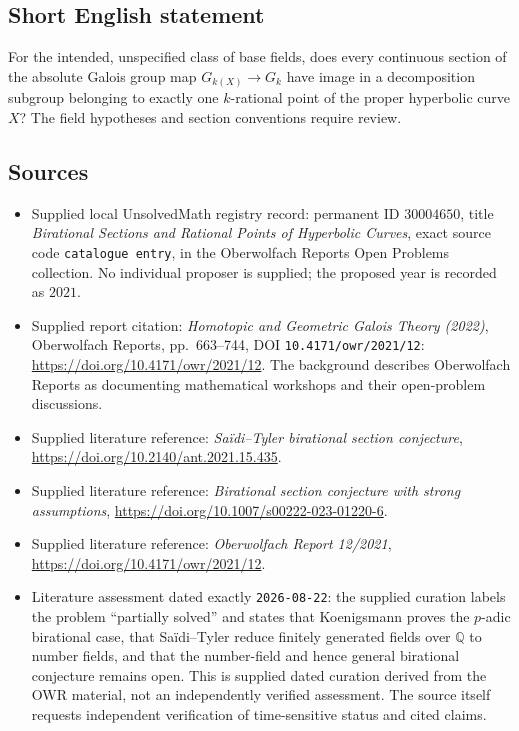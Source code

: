 \documentclass[11pt]{article}
\newcommand{\Q}{\mathbb{Q}}
\begin{document}
\subsection{Short English statement}
For the intended, unspecified class of base fields, does every continuous section of the absolute Galois group map \(G_{k(X)}\to G_k\) have image in a decomposition subgroup belonging to exactly one \(k\)-rational point of the proper hyperbolic curve \(X\)? The field hypotheses and section conventions require review.
\subsection{Sources}
\begin{itemize}
\item Supplied local UnsolvedMath registry record: permanent ID \(30004650\), title \emph{Birational Sections and Rational Points of Hyperbolic Curves}, exact source code \texttt{catalogue entry}, in the Oberwolfach Reports Open Problems collection. No individual proposer is supplied; the proposed year is recorded as \(2021\).
\item Supplied report citation: \emph{Homotopic and Geometric Galois Theory (2022)}, Oberwolfach Reports, pp.\ 663--744, DOI \texttt{10.4171/owr/2021/12}: \url{https://doi.org/10.4171/owr/2021/12}. The background describes Oberwolfach Reports as documenting mathematical workshops and their open-problem discussions.
\item Supplied literature reference: \emph{Saïdi--Tyler birational section conjecture}, \url{https://doi.org/10.2140/ant.2021.15.435}.
\item Supplied literature reference: \emph{Birational section conjecture with strong assumptions}, \url{https://doi.org/10.1007/s00222-023-01220-6}.
\item Supplied literature reference: \emph{Oberwolfach Report 12/2021}, \url{https://doi.org/10.4171/owr/2021/12}.
\item Literature assessment dated exactly \texttt{2026-08-22}: the supplied curation labels the problem ``partially solved'' and states that Koenigsmann proves the \(p\)-adic birational case, that Saïdi--Tyler reduce finitely generated fields over \(\Q\) to number fields, and that the number-field and hence general birational conjecture remains open. This is supplied dated curation derived from the OWR material, not an independently verified assessment. The source itself requests independent verification of time-sensitive status and cited claims.
\end{itemize}
\end{document}

